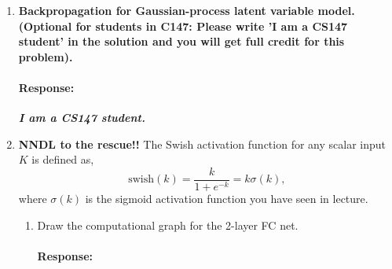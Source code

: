 \documentclass{article}
\newcommand{\T}{\bf{T}}
\newcommand{\x}{\bf{x}}
\newcommand{\W}{\bf{W}}
\newcommand{\pd}[2]{\frac{\partial{#1}}{\partial{#2}}}
\newenvironment{response}{\begin{responseframe}\vspace{-10pt}\paragraph{Response:}}{\end{responseframe}}
\renewcommand{\it}[1]{\textit{{#1}}}
\renewcommand{\bf}[1]{\textbf{{#1}}}
\newcommand{\ib}[1]{\it{\bf{{#1}}}}
\begin{document}
\begin{enumerate}
\begin{enumerate}
\begin{response}
                \end{response}
            \item Calculate the gradient: $\nabla_{\W} \mathcal{L}$.
                \begin{response}
                    Given the computational graph drawn in (b),
                    \begin{align*}
                        \pd{\mathcal{L}}{(\W^{\T} \W \x - \x)} 
                        &= \W^{\T} \W \x - \x \\
                    \pd{\mathcal{L}}{(\W^{\T})}
                        &= (\W^{\T} \W \x - \x) (\W \x)^{\T} && (*) \\
                    \pd{\mathcal{L}}{(\W \x)}
                        &= \W (\W^{\T} \W \x - \x) \\
                    \pd{\mathcal{L}}{\W}
                        &= \W (\W^{\T} \W \x - \x) \x^{\T} && (**) \\
                    \end{align*}
                    so 
                    $ 
                    \nabla_{\W} \mathcal{L} = (*) + (**)
                    = \W (\W^{\T} \W \x - \x) \x^{\T}
                    + \left( (\W^{\T} \W \x - \x) (\W \x)^{\T} \right)^{\T}
                    = \W (\W^{\T} \W \x - \x) \x^{\T}
                    + (\W \x)(\W^{\T} \W \x - \x)^{\T}
                    $.
                \end{response}
        \end{enumerate}
    \item \bf{Backpropagation for Gaussian-process latent variable model. (Optional for students in
        C147: Please write 'I am a CS147 student' in the solution and you will get full credit for
    this problem).}
        \begin{response}
            \ib{I am a CS147 student.}
        \end{response}
        \newpage
    \item \bf{NNDL to the rescue!!}
        The Swish activation function for any scalar input $K$ is defined as,
        \[
            \text{swish}(k) = \frac{k}{1 + e^{-k}} = k \sigma (k),
        \]
        where $\sigma(k)$ is the sigmoid activation function you have seen in lecture.
        \begin{enumerate}
            \item Draw the computational graph for the 2-layer FC net.
                \begin{response}
                    \hfil
                    \vspace{10em}


\end{response}
\end{enumerate}
\end{enumerate}
\end{document}
